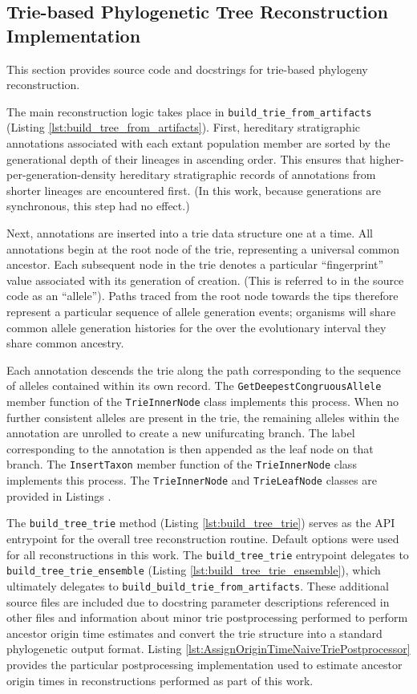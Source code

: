 \subsection{Trie-based Phylogenetic Tree Reconstruction Implementation}

This section provides source code and docstrings for trie-based phylogeny reconstruction.

The main reconstruction logic takes place in \texttt{build\_trie\_from\_artifacts} (Listing \ref{lst:build_tree_from_artifacts}).
First, hereditary stratigraphic annotations associated with each extant population member are sorted by the generational depth of their lineages in ascending order.
This ensures that higher-per-generation-density hereditary stratigraphic records of annotations from shorter lineages are encountered first.
(In this work, because generations are synchronous, this step had no effect.)

Next, annotations are inserted into a trie data structure one at a time.
All annotations begin at the root node of the trie, representing a universal common ancestor.
Each subsequent node in the trie denotes a particular ``fingerprint'' value associated with its generation of creation.
(This is referred to in the source code as an ``allele'').
Paths traced from the root node towards the tips therefore represent a particular sequence of allele generation events; organisms will share common allele generation histories for the over the evolutionary interval they share common ancestry.

Each annotation descends the trie along the path corresponding to the sequence of alleles contained within its own record.
The \texttt{GetDeepestCongruousAllele} member function of the \texttt{TrieInnerNode} class implements this process.
When no further consistent alleles are present in the trie, the remaining alleles within the annotation are unrolled to create a new unifurcating branch.
The label corresponding to the annotation is then appended as the leaf node on that branch.
The \texttt{InsertTaxon} member function of the \texttt{TrieInnerNode} class implements this process.
The \texttt{TrieInnerNode} and \texttt{TrieLeafNode} classes are provided in Listings .

The \texttt{build\_tree\_trie} method (Listing \ref{lst:build_tree_trie}) serves as the API entrypoint for the overall tree reconstruction routine.
Default options were used for all reconstructions in this work.
The \texttt{build\_tree\_trie} entrypoint delegates to \texttt{build\_tree\_trie\_ensemble} (Listing \ref{lst:build_tree_trie_ensemble}), which ultimately delegates to \texttt{build\_build\_trie\_from\_artifacts}.
These additional source files are included due to docstring parameter descriptions referenced in other files and information about minor trie postprocessing performed to perform ancestor origin time estimates and convert the trie structure into a standard phylogenetic output format.
Listing \ref{lst:AssignOriginTimeNaiveTriePostprocessor} provides the particular postprocessing implementation used to estimate ancestor origin times in reconstructions performed as part of this work.

